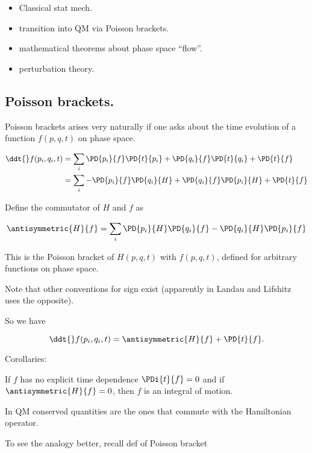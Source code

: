 \begin{itemize}
\item Classical stat mech.
\item transition into QM via Poisson brackets.
\item mathematical theorems about phase space ``flow''.
\item perturbation theory.
\end{itemize}

\subsection{Poisson brackets.}

Poisson brackets arises very naturally if one asks about the time evolution of a function $f(p, q, t)$ on phase space.

\begin{align*}
\ddt{} f(p_i, q_i, t)
&=
\sum_i
 \PD{p_i}{f} \PD{t}{p_i}
+ \PD{q_i}{f} \PD{t}{q_i}
+ \PD{t}{f} \\
&=
\sum_i
- \PD{p_i}{f} \PD{q_i}{H}
+ \PD{q_i}{f} \PD{p_i}{H}
+ \PD{t}{f}
\end{align*}

Define the commutator of $H$ and $f$ as

\begin{equation}\label{eqn:phaseSpaceAndTrajectories:70}
\antisymmetric{H}{f} =
\sum_i
\PD{p_i}{H}
\PD{q_i}{f}
-
\PD{q_i}{H}
\PD{p_i}{f}
\end{equation}

This is the Poisson bracket of $H(p,q,t)$ with $f(p,q,t)$, defined for arbitrary functions on phase space.

Note that other conventions for sign exist (apparently in Landau and Lifshitz uses the opposite).

So we have

\begin{equation}\label{eqn:phaseSpaceAndTrajectories:90}
\ddt{} f(p_i, q_i, t) = \antisymmetric{H}{f} + \PD{t}{f}.
\end{equation}

Corollaries:

If $f$ has no explicit time dependence $\PDi{t}{f} = 0$ and if $\antisymmetric{H}{f} = 0$, then $f$ is an integral of motion.

In QM conserved quantities are the ones that commute with the Hamiltonian operator.

To see the analogy better, recall def of Poisson bracket


